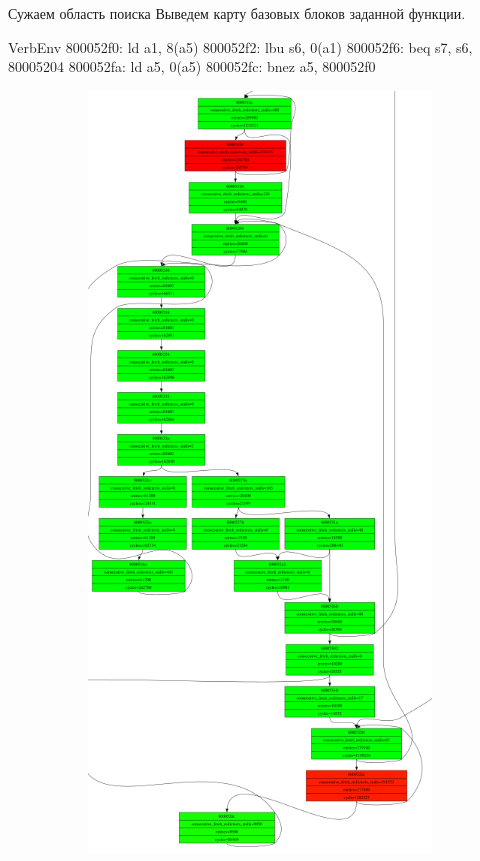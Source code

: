 \documentclass[10pt,aspectratio=169,hyperref={pdftex,unicode},xcolor=dvipsnames]{beamer}
\begin{document}
\begin{frame}[fragile]{ Сужаем область поиска }
    Выведем карту базовых блоков заданной функции.


\begin{SaveVerbatim}[]{VerbEnv}
800052f0:	ld a1, 8(a5)
800052f2:	lbu s6, 0(a1)
800052f6:	beq s7, s6, 80005204
800052fa:	ld a5, 0(a5)
800052fc:	bnez a5, 800052f0
\end{SaveVerbatim}

    \pause
    \begin{figure}
        \begin{subfigure}{0.45\textwidth}
            \centering
            \includegraphics[height=0.8\textheight,keepaspectratio]{./images/stac_blocks.png}

\end{subfigure}
\end{figure}
\end{frame}
\end{document}
